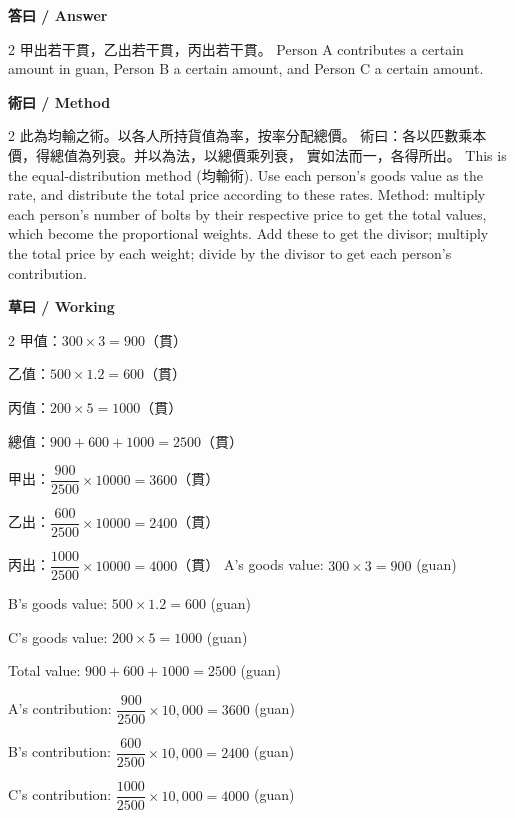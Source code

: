 \documentclass[11pt,a4paper]{article}
\begin{document}
\vspace{0.4em}
\noindent\textbf{\textcolor{chinesecolor}{答曰} / \textcolor{englishcolor}{Answer}}
\vspace{0.2em}
\begin{paracol}{2}
甲出若干貫，乙出若干貫，丙出若干貫。
\switchcolumn
Person A contributes a certain amount in guan, Person B a certain amount,
and Person C a certain amount.
\end{paracol}

\vspace{0.4em}
\noindent\textbf{\textcolor{chinesecolor}{術曰} / \textcolor{englishcolor}{Method}}
\vspace{0.2em}
\begin{paracol}{2}
此為均輸之術。以各人所持貨值為率，按率分配總價。
術曰：各以匹數乘本價，得總值為列衰。并以為法，以總價乘列衰，
實如法而一，各得所出。
\switchcolumn
This is the equal-distribution method (均輸術). Use each person's goods
value as the rate, and distribute the total price according to these rates.
Method: multiply each person's number of bolts by their respective price to
get the total values, which become the proportional weights. Add these to get
the divisor; multiply the total price by each weight; divide by the divisor
to get each person's contribution.
\end{paracol}

\vspace{0.4em}
\noindent\textbf{\textcolor{chinesecolor}{草曰} / \textcolor{englishcolor}{Working}}
\vspace{0.2em}
\begin{paracol}{2}
甲值：$300 \times 3 = 900$（貫）

乙值：$500 \times 1.2 = 600$（貫）

丙值：$200 \times 5 = 1000$（貫）

總值：$900 + 600 + 1000 = 2500$（貫）

甲出：$\dfrac{900}{2500} \times 10000 = 3600$（貫）

乙出：$\dfrac{600}{2500} \times 10000 = 2400$（貫）

丙出：$\dfrac{1000}{2500} \times 10000 = 4000$（貫）
\switchcolumn
A's goods value: $300 \times 3 = 900$ (guan)

B's goods value: $500 \times 1.2 = 600$ (guan)

C's goods value: $200 \times 5 = 1000$ (guan)

Total value: $900 + 600 + 1000 = 2500$ (guan)

A's contribution: $\dfrac{900}{2500} \times 10{,}000 = 3600$ (guan)

B's contribution: $\dfrac{600}{2500} \times 10{,}000 = 2400$ (guan)

C's contribution: $\dfrac{1000}{2500} \times 10{,}000 = 4000$ (guan)
\end{paracol}
\end{document}

